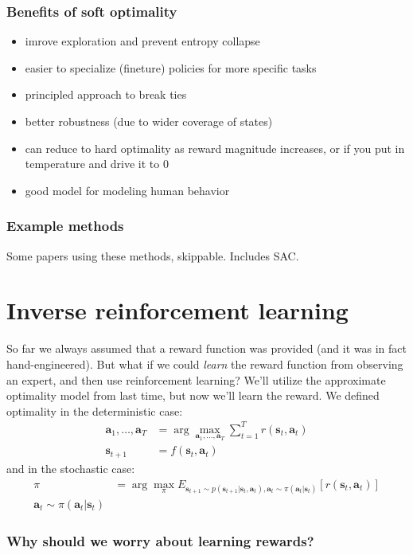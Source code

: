 \documentclass{report}
\newcommand{\argmax}{\arg\!\max}
\begin{document}
\subsection{Benefits of soft optimality}
\begin{itemize}
		\item imrove exploration and prevent entropy collapse
		\item easier to specialize (fineture) policies for more specific tasks
		\item principled approach to break ties
		\item better robustness (due to wider coverage of states)
		\item can reduce to hard optimality as reward magnitude increases, or if you put in temperature and drive it to 0
		\item good model for modeling human behavior
\end{itemize}

\subsection{Example methods}
Some papers using these methods, skippable.
Includes SAC.

\chapter{Inverse reinforcement learning}
So far we always assumed that a reward function was provided (and it was in fact hand-engineered).
But what if we could \textit{learn}  the reward function from observing an expert, and then use reinforcement learning?
We'll utilize the approximate optimality model from last time, but now we'll learn the reward.
We defined optimality in the deterministic case:
\begin{align}
		\bm{a}_{1}, \dots, \bm{a}_{T} &= \argmax_{\bm{a}_{1}, \dots, \bm{a}_{T}} \sum_{t=1}^{T} r(\bm{s}_{t}, \bm{a}_{t} ) \\
		\bm{s}_{t+1} &= f(\bm{s}_{t}, \bm{a}_{t} )
\end{align}
and in the stochastic case:
\begin{align}
		\pi &= \argmax_{\pi} E_{ \bm{s}_{t+1} \sim p (\bm{s}_{t+1}| \bm{s}_{t}, \bm{a}_{t} ), \bm{a}_{t} \sim \pi (\bm{a}_{t}| \bm{s}_{t} ) } \left[ r (\bm{s}_{t}, \bm{a}_{t} ) \right] 	\\
		\bm{a}_{t} \sim \pi (\bm{a}_{t}| \bm{s}_{t} )
\end{align}

\subsection{Why should we worry about learning rewards?}
\end{document}

